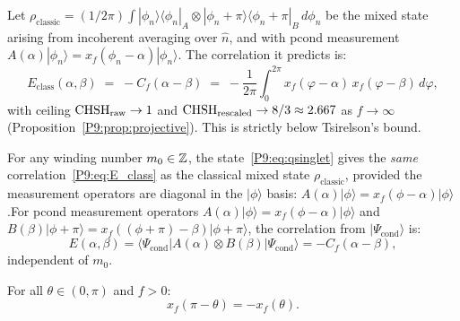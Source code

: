 \begin{proposition}
\label{P9:prop:incoherence}
Let $\rho_\mathrm{classic} = (1/2\pi)\int|\phi_n\rangle\langle\phi_n|_A\otimes|\phi_n{+}\pi\rangle\langle\phi_n{+}\pi|_B\,d\phi_n$ be the mixed state arising from incoherent averaging over $\hat{n}$, and with pcond measurement $A(\alpha)|\phi_n\rangle = x_f(\phi_n-\alpha)|\phi_n\rangle$.
The correlation it predicts is:
\begin{equation}
  E_\mathrm{class}(\alpha,\beta)
  \;=\; -C_f(\alpha-\beta)
  \;=\; -\frac{1}{2\pi}\int_0^{2\pi}
  x_f(\varphi-\alpha)\,x_f(\varphi-\beta)\,d\varphi,
  \label{P9:eq:E_class}
\end{equation}
with ceiling $\mathrm{CHSH}_\mathrm{raw}\to1$ and $\mathrm{CHSH}_\mathrm{rescaled}\to8/3\approx2.667$
as $f\to\infty$ (Proposition~\ref{P9:prop:projective}).
This is strictly below Tsirelson's bound.
\end{proposition}

\begin{proposition}
\label{P9:prop:phase_invariance}
For any winding number $m_0\in\mathbb{Z}$, the state~\eqref{P9:eq:qsinglet}
gives the \emph{same} correlation~\eqref{P9:eq:E_class} as the classical
mixed state $\rho_\mathrm{classic}$, provided the measurement operators
are diagonal in the $|\phi\rangle$ basis:
$A(\alpha)|\phi\rangle = x_f(\phi-\alpha)|\phi\rangle$.For pcond measurement operators $A(\alpha)|\phi\rangle = x_f(\phi-\alpha)|\phi\rangle$
and $B(\beta)|\phi+\pi\rangle = x_f((\phi+\pi)-\beta)|\phi+\pi\rangle$,
the correlation from $|\Psi_\mathrm{cond}\rangle$ is:
 \begin{equation}
  E(\alpha,\beta)
  = \langle\Psi_\mathrm{cond}|A(\alpha)\otimes B(\beta)|\Psi_\mathrm{cond}\rangle
  = -C_f(\alpha-\beta),
\end{equation}
independent of $m_0$.
\end{proposition}

\begin{lemma}
\label{P9:lem:antisymmetry}
For all $\theta\in(0,\pi)$ and $f>0$:
\begin{equation}
  x_f(\pi-\theta) = -x_f(\theta).
  \label{P9:eq:antisymmetry}
\end{equation}
\end{lemma}

